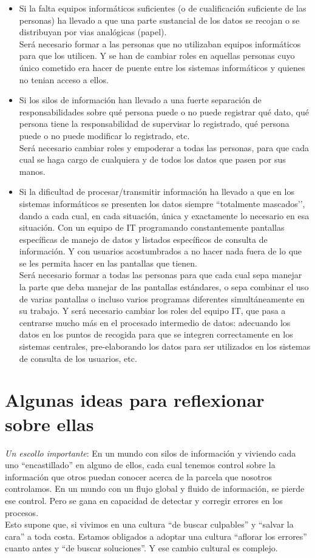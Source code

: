 \documentclass[spanish,12pt,a4paper,final,oneside]{book}
\begin{document}
\begin{itemize}
\item Si la falta equipos informáticos suficientes (o de cualificación suficiente de las personas) ha llevado a que una parte sustancial de los datos se recojan o se distribuyan por vias analógicas (papel).
\\ Será necesario formar a las personas que no utilizaban equipos informáticos para que los utilicen. Y se han de cambiar roles en aquellas personas cuyo único cometido era hacer de puente entre los sistemas informáticos y quienes no tenian acceso a ellos.

\item Si los silos de información han llevado a una fuerte separación de responsabilidades sobre qué persona puede o no puede registrar qué dato, qué persona tiene la responsabilidad de supervisar lo registrado, qué persona puede o no puede modificar lo registrado, etc.
\\ Será necesario cambiar roles y empoderar a todas las personas, para que cada cual se haga cargo de cualquiera y de todos los datos que pasen por sus manos.

\item Si la dificultad de procesar/transmitir información ha llevado a que en los sistemas informáticos se presenten los datos siempre ``totalmente mascados'’, dando a cada cual, en cada situación, única y exactamente lo necesario en esa situación.  Con un equipo de IT programando constantemente pantallas específicas de manejo de datos y listados específicos de consulta de información. Y con usuarios acostumbrados a no hacer nada fuera de lo que se les permita hacer en las pantallas que tienen. 
\\Será necesario formar a todas las personas para que cada cual sepa manejar la parte que deba manejar de las pantallas estándares, o sepa combinar el uso de varias pantallas o incluso varios programas diferentes simultáneamente en su trabajo. Y será necesario cambiar los roles del equipo IT, que pasa a centrarse mucho más en el procesado intermedio de datos: adecuando los datos en los puntos de recogida para que se integren correctamente en los sistemas centrales, pre-elaborando los datos para ser utilizados en los sistemas de consulta de los usuarios, etc.
\end{itemize}

\section{Algunas ideas para reflexionar sobre ellas}
\textit{Un escollo importante}: En un mundo con silos de información y viviendo cada uno ``encastillado'' en alguno de ellos, cada cual tenemos control sobre la información que otros puedan conocer acerca de la parcela que nosotros controlamos. En un mundo con un flujo global y fluido de información, se pierde ese control. Pero se gana en capacidad de detectar y corregir errores en los procesos. 
\\Esto supone que, si vivimos en una cultura ``de buscar culpables'' y ``salvar la cara'' a toda costa. Estamos obligados a adoptar una cultura ``aflorar los errores'' cuanto antes y ``de buscar soluciones''. Y ese cambio cultural es complejo.
\end{document}
